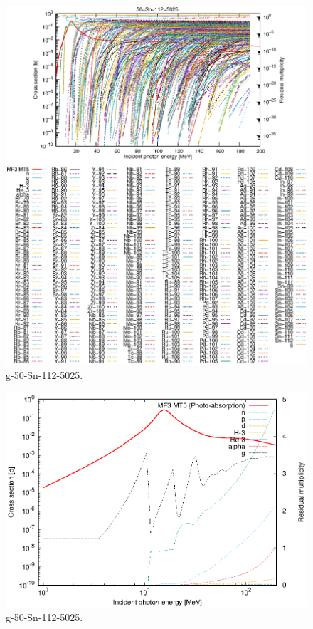 \begin{figure}
 \includegraphics[width=\linewidth]{eps/g_50-Sn-112_5025.eps}
  \caption{g-50-Sn-112-5025.}
\end{figure}
\newpage \clearpage

\begin{figure}
 \includegraphics[width=\linewidth]{eps-log/g_50-Sn-112_5025.eps}
 \caption{g-50-Sn-112-5025.}
\end{figure}
\newpage \clearpage

